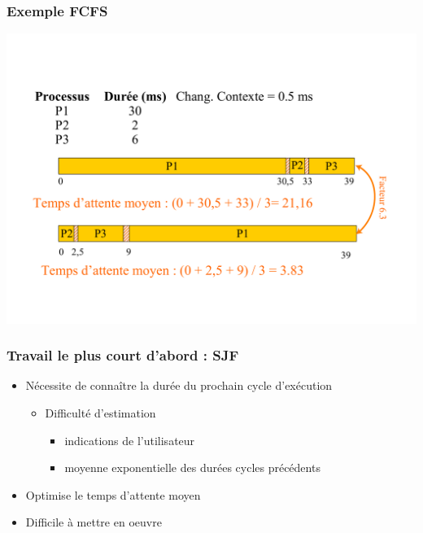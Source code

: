 \begin{frame}
 \frametitle{Exemple FCFS}
 \includegraphics[width=\textwidth]{../illustration/fcfs_exemple.pdf}
\end{frame}


\begin{frame}
 \frametitle{Travail le plus court d’abord : SJF}
 \begin{itemize}
 \item Nécessite de connaître la durée du prochain cycle d’exécution
\begin{itemize}
 \item Difficulté d’estimation
 \begin{itemize}
 \item indications de l’utilisateur
 \item moyenne exponentielle des durées cycles précédents
 \end{itemize}
 \end{itemize}

 \item Optimise le temps d’attente moyen
\item Difficile à mettre en oeuvre
 \end{itemize}
\end{frame}




